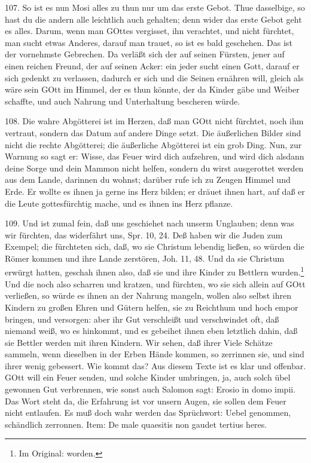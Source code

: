 107. So ist es nun Mosi alles zu thun nur um das erste Gebot. Thue dasselbige, so hast du die andern alle leichtlich auch gehalten; denn wider das erste Gebot geht es alles. Darum, wenn man GOttes vergisset, ihn verachtet, und nicht fürchtet, man sucht etwas Anderes, darauf man trauet, so ist es bald geschehen. Das ist der vornehmste Gebrechen. Da verläßt sich der auf seinen Fürsten, jener auf einen reichen Freund, der auf seinen Acker: ein jeder sucht einen Gott, darauf er sich gedenkt zu verlassen, dadurch er sich und die Seinen ernähren will, gleich als wäre sein GOtt im Himmel, der es thun könnte, der
da Kinder gäbe und Weiber schaffte, und auch Nahrung und Unterhaltung bescheren würde.

108. Die wahre Abgötterei ist im Herzen, daß man GOtt nicht fürchtet, noch ihm vertraut, sondern das Datum auf andere Dinge setzt. Die äußerlichen Bilder sind nicht die rechte Abgötterei; die äußerliche Abgötterei ist ein grob Ding. Nun, zur Warnung so sagt er: Wisse, das Feuer wird dich aufzehren, und wird dich alsdann deine Sorge und dein Mammon nicht helfen, sondern du wirst ausgerottet werden aus dem Lande, darinnen du wohnst; darüber rufe ich zu Zeugen Himmel und Erde. Er wollte es ihnen ja gerne ins Herz bilden; er dräuet ihnen hart, auf daß er die Leute gottesfürchtig mache, und es ihnen ins Herz pflanze.

109. Und ist zumal fein, daß uns geschiehet nach unserm Unglauben; denn was wir fürchten, das widerfährt uns, Spr. 10, 24. Deß haben wir die Juden zum Exempel; die fürchteten sich, daß, wo sie Christum lebendig ließen, so würden die Römer kommen und ihre Lande zerstören, Joh. 11, 48. Und da sie Christum erwürgt hatten, geschah ihnen also, daß sie und ihre Kinder zu Bettlern wurden.\footnote{Im Original: worden.} Und die noch also scharren und kratzen, und fürchten, wo sie sich allein auf GOtt verließen, so würde es ihnen an der Nahrung mangeln, wollen also selbst ihren Kindern zu großen Ehren und Gütern helfen, sie zu Reichthum und hoch empor bringen, und versorgen: aber ihr Gut verschleißt und verschwindet oft, daß niemand weiß, wo es hinkommt, und es gebeihet ihnen eben letztlich dahin, daß sie Bettler werden mit ihren Kindern. Wir sehen, daß ihrer Viele Schätze sammeln, wenn dieselben in der Erben Hände kommen, so zerrinnen sie, und sind ihrer wenig gebessert. Wie kommt das? Aus diesem Texte ist es klar und offenbar. GOtt will ein Feuer senden, und solche Kinder umbringen, ja, auch solch übel gewonnen Gut verbrennen, wie sonst auch Salomon sagt: Erosio in domo impii. Das Wort steht da, die Erfahrung ist vor unsern Augen, sie sollen dem Feuer nicht entlaufen. Es muß doch wahr werden das Sprüchwort: Uebel genommen, schändlich zerronnen. Item: De male quaesitis non gaudet tertius heres.

